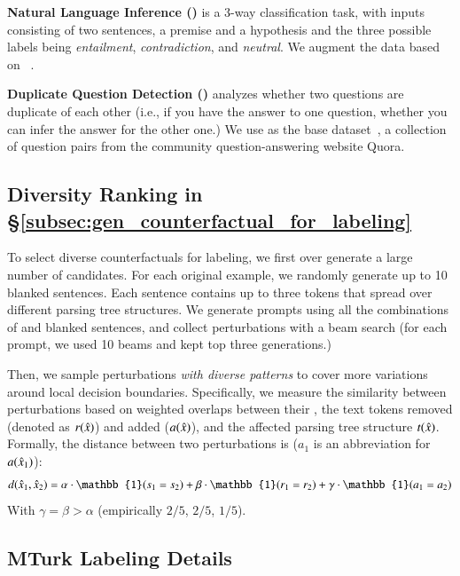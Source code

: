 \textbf{Natural Language Inference (\nli)} is a 3-way classification task, with inputs consisting of two sentences, a premise and a hypothesis and the three possible labels being \emph{entailment}, \emph{contradiction}, and \emph{neutral}.
We augment the data based on \dnli~\cite{bowman-etal-2015-large}. 
 
\textbf{Duplicate Question Detection (\qqp)} analyzes whether two questions are duplicate of each other (i.e., if you have the answer to one question, whether you can infer the answer for the other one.) 
We use \dqqp as the base dataset~\cite{wang2018glue}, a collection of question pairs from the community question-answering website Quora.

\subsection{Diversity Ranking in \S\ref{subsec:gen_counterfactual_for_labeling}}

To select diverse counterfactuals for labeling, we first over generate a large number of candidates.
For each original example, we randomly generate up to 10 blanked sentences. Each sentence contains up to three \BLANK tokens that spread over different parsing tree structures.
We generate prompts using all the combinations of \tagstrs and blanked sentences, and collect perturbations with a beam search (for each prompt, we used 10 beams and kept top three generations.)

Then, we sample perturbations \emph{with diverse patterns} to cover more variations around local decision boundaries.
Specifically, we measure the similarity between perturbations based on weighted overlaps between their \tagstrs, the text tokens removed (denoted as $r(\hat{x})$) and added ($a(\hat{x})$), and the affected parsing tree structure $t(\hat{x})$. 
Formally, the distance between two perturbations is ($a_1$ is an abbreviation for $a(\hat{x}_1)$):
$$d(\xp_1, \xp_2) = \alpha\cdot\mathbb{1}(s_1 = s_2) + \beta\cdot\mathbb{1}(r_1 = r_2) + \gamma\cdot\mathbb{1}(a_1=a_2)$$
With $\gamma = \beta > \alpha$ (empirically $2/5$, $2/5$, $1/5$).

\subsection{MTurk Labeling Details}
\label{appendix:label_instruct}

